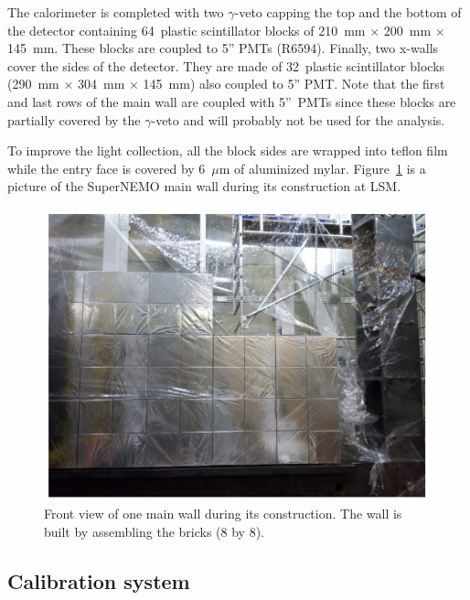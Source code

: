 \documentclass[main.tex]{subfiles}
\begin{document}
\NI The calorimeter is completed with two $\gamma$-veto capping the top and the bottom of the detector containing 64~plastic scintillator blocks of 210~mm $\times$ 200~mm $\times$ 145~mm. These blocks are coupled to 5'' PMTs (R6594). Finally, two x-walls cover the sides of the detector. They are made of 32~plastic scintillator blocks (290~mm $\times$ 304~mm $\times$ 145~mm) also coupled to 5'' PMT. Note that the first and last rows of the main wall are coupled with 5''~PMTs since these blocks are partially covered by the $\gamma$-veto and will probably not be used for the analysis.

\bigskip


\NI To improve the light collection, all the block sides are wrapped into teflon film while the entry face is covered by 6~$\mu$m of aluminized mylar. Figure~\ref{SnemoCaloFrontView} is a picture of the SuperNEMO main wall during its construction at LSM. %


\begin{figure}[h!]
\begin{center}
\includegraphics[scale=0.5]{pictures/Chap3/FrontViewCalo.png}
\caption{Front view of one main wall during its construction. The wall is built by assembling the bricks (8 by 8).}
\label{SnemoCaloFrontView}
\end{center}
\end{figure}

\FloatBarrier


\subsection{Calibration system}
\end{document}
